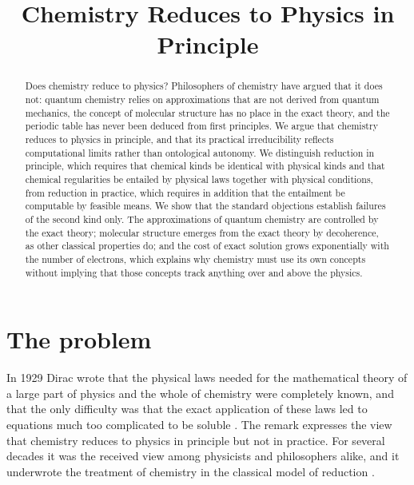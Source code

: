 \documentclass{situationist-preprint}
\title{Chemistry Reduces to Physics in Principle}
\begin{document}
\maketitle

\begin{abstract}
Does chemistry reduce to physics? Philosophers of chemistry have argued that it does not: quantum chemistry relies on approximations that are not derived from quantum mechanics, the concept of molecular structure has no place in the exact theory, and the periodic table has never been deduced from first principles. We argue that chemistry reduces to physics in principle, and that its practical irreducibility reflects computational limits rather than ontological autonomy. We distinguish reduction in principle, which requires that chemical kinds be identical with physical kinds and that chemical regularities be entailed by physical laws together with physical conditions, from reduction in practice, which requires in addition that the entailment be computable by feasible means. We show that the standard objections establish failures of the second kind only. The approximations of quantum chemistry are controlled by the exact theory; molecular structure emerges from the exact theory by decoherence, as other classical properties do; and the cost of exact solution grows exponentially with the number of electrons, which explains why chemistry must use its own concepts without implying that those concepts track anything over and above the physics.
\end{abstract}

\section{The problem}

In 1929 Dirac wrote that the physical laws needed for the mathematical theory of a large part of physics and the whole of chemistry were completely known, and that the only difficulty was that the exact application of these laws led to equations much too complicated to be soluble \citep{Dirac1929}. The remark expresses the view that chemistry reduces to physics in principle but not in practice. For several decades it was the received view among physicists and philosophers alike, and it underwrote the treatment of chemistry in the classical model of reduction \citep{Nagel1961}.
\end{document}
